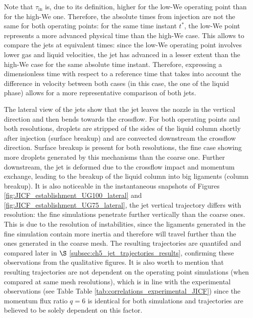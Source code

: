 Note that $\tau_\mathrm{in}$ is, due to its definition, higher for the low-We operating point than for the high-We one. Therefore, the absolute times from injection are not the same for both operating points: for the same time instant $t^*$, the low-We point represents a more advanced physical time than the high-We case. This allows to compare the jets at equivalent times: since the low-We operating point involves lower gas and liquid velocities, the jet has advanced in a lesser extent than the high-We case for the same absolute time instant. Therefore, expressing a dimensionless time with respect to a reference time that takes into account the difference in velocity between both cases (in this case, the one of the liquid phase) allows for a more representative comparison of both jets.

The lateral view of the jets show that the jet leaves the nozzle in the vertical direction and then bends towards the crossflow. For both operating points and both resolutions, droplets are stripped of the sides of the liquid column shortly after injection (surface breakup) and are convected downstream the crossflow direction. Surface breakup is present for both resolutions, the fine case showing more droplets generated by this mechanisms than the coarse one. Further downstream, the jet is deformed due to the crossflow impact and momentum exchange, leading to the breakup of the liquid column into big ligaments (column breakup). It is also noticeable in the instantaneous snapshots of Figures \ref{fig:JICF_establishment_UG100_lateral} and \ref{fig:JICF_establishment_UG75_lateral}, the jet vertical trajectory differs with resolution: the fine simulations penetrate further vertically than the coarse ones. This is due to the resolution of instabilities, since the ligaments generated in the fine simulation contain more inertia and therefore will travel further than the ones generated in the coarse mesh. The resulting trajectories are quantifed and compared later in $\S$ \ref{subsec:ch5_jet_trajectories_results}, confirming these observations from the qualitative figures. It is also worth to mention that resulting trajectories are not dependent on the operating point simulations (when compared at same mesh resolutions), which is in line with the experimental observations (see Table Table \ref{tab:correlations_experimental_JICF}) since the momentum flux ratio $q = 6$ is identical for both simulations and trajectories are believed to be solely dependent on this factor.

